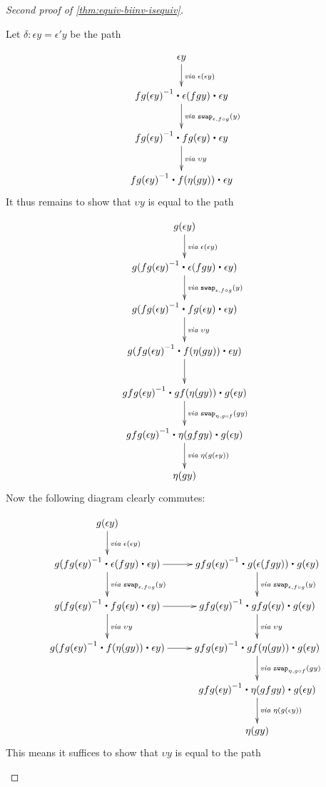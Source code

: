 \begin{proof}[Second proof of \autoref{thm:equiv-biinv-isequiv}]
\begin{enumerate}
Let $\delta : \epsilon y = \epsilon' y$ be the path 

\begin{align*}
\xymatrix{
\epsilon y \ar[d]^{\mathit{via \;} \epsilon(\epsilon y)} \\
\opp{fg(\epsilon y)} \ct \epsilon (f g y) \ct \epsilon y \ar[d]^{\mathit{via \; } \com{\epsilon}{f \circ g}{y}} \\
\opp{fg(\epsilon y)} \ct fg (\epsilon y) \ct \epsilon y \ar[d]^{\mathit{via \;} \upsilon y} \\
\opp{fg(\epsilon y)} \ct f (\eta(g y)) \ct \epsilon y}
\end{align*}
It thus remains to show that $\upsilon y$ is equal to the path

\begin{align*}
\xymatrix{
g(\epsilon y) \ar[d]^{\mathit{via \;} \epsilon(\epsilon y)} \\
g(\opp{fg(\epsilon y)} \ct \epsilon (f g y) \ct \epsilon y) \ar[d]^{\mathit{via \; } \com{\epsilon}{f \circ g}{y}} \\
g(\opp{fg(\epsilon y)} \ct fg (\epsilon y) \ct \epsilon y) \ar[d]^{\mathit{via \;} \upsilon y} \\
g(\opp{fg(\epsilon y)} \ct f (\eta(g y)) \ct \epsilon y) \ar[d] \\
\opp{gfg(\epsilon y)} \ct gf(\eta (g y)) \ct g(\epsilon y) \ar[d]^{\mathit{via\;}\com{\eta}{g\circ f}{gy}} \\
\opp{gfg(\epsilon y)} \ct \eta (gfgy) \ct g(\epsilon y) \ar[d]^{\mathit{via \;} \eta(g(\epsilon y))} \\
\eta(g y)}
\end{align*}
Now the following diagram clearly commutes:

\begin{align*}
\xymatrix{
g(\epsilon y) \ar[d]^{\mathit{via \;} \epsilon(\epsilon y)} & \\
g(\opp{fg(\epsilon y)} \ct \epsilon (f g y) \ct \epsilon y) \ar[d]^{\mathit{via \; } \com{\epsilon}{f \circ g}{y}} \ar[r] &
\opp{gfg(\epsilon y)} \ct g(\epsilon (f g y)) \ct g(\epsilon y) \ar[d]^{\mathit{via \; } \com{\epsilon}{f \circ g}{y}} \\  
g(\opp{fg(\epsilon y)} \ct fg (\epsilon y) \ct \epsilon y) \ar[d]^{\mathit{via \;} \upsilon y} \ar[r] &
\opp{gfg(\epsilon y)} \ct gfg (\epsilon y) \ct g(\epsilon y) \ar[d]^{\mathit{via \;} \upsilon y} \\
g(\opp{fg(\epsilon y)} \ct f (\eta(g y)) \ct \epsilon y) \ar[r] &
\opp{gfg(\epsilon y)} \ct gf(\eta (g y)) \ct g(\epsilon y) \ar[d]^{\mathit{via\;}\com{\eta}{g\circ f}{gy}} \\
 & \opp{gfg(\epsilon y)} \ct \eta (gfgy) \ct g(\epsilon y) \ar[d]^{\mathit{via \;} \eta(g(\epsilon y))} \\
 & \eta(g y)}
\end{align*}
This means it suffices to show that $\upsilon y$ is equal to the path


\end{enumerate}
\end{proof}
